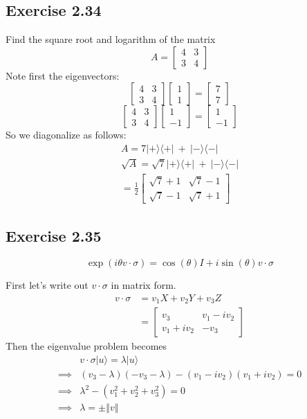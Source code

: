 \documentclass[]{article}
\newcommand{\bra}[1]{\langle #1 |}
\newcommand{\ket}[1]{| #1 \rangle}
\newcommand{\norm}[1]{\left\Vert #1 \right\Vert}
\begin{document}
\subsection{Exercise 2.34}
Find the square root and logarithm of the matrix
\[A=\left[\begin{matrix}
4 & 3\\
3 & 4
\end{matrix}\right]\]
Note first the eigenvectors:
\[
\left[\begin{matrix}
4 & 3\\
3 & 4
\end{matrix}\right]
\left[\begin{matrix}
1\\
1
\end{matrix}\right]
=
\left[\begin{matrix}
7\\
7
\end{matrix}\right]
\]
\[
\left[\begin{matrix}
4 & 3\\
3 & 4
\end{matrix}\right]
\left[\begin{matrix}
1\\
-1
\end{matrix}\right]
=
\left[\begin{matrix}
1\\
-1
\end{matrix}\right]
\]
So we diagonalize as follows:
\begin{align*}
A = 7\ket{+}\bra{+}\ +\ \ket{-}\bra{-}
\\\sqrt{A} = \sqrt{7}\ket{+}\bra{+}\ +\ \ket{-}\bra{-}
\\=
\frac{1}{2}\left[\begin{matrix}
\sqrt{7}+1 & \sqrt{7}-1\\
\sqrt{7}-1 & \sqrt{7}+1
\end{matrix}\right]
\end{align*}

\subsection{Exercise 2.35}
\[\exp(i\theta v\cdot \sigma)=\cos(\theta)I+i\sin(\theta) v\cdot \sigma\]

First let's write out $v \cdot \sigma$ in matrix form.
\begin{align*}
v \cdot \sigma
&= v_1X + v_2Y + v_3Z
\\&=
\left[\begin{matrix}
v_3 & v_1 -iv_2\\
v_1+iv_2 & -v_3
\end{matrix}\right]
\end{align*}
Then the eigenvalue problem becomes
\begin{align*}
&v \cdot \sigma \ket{u} = \lambda \ket{u}
\\\implies& (v_3-\lambda)(-v_3-\lambda) -(v_1-iv_2)(v_1+iv_2) = 0
\\\implies& \lambda^2 - (v_1^2 + v_2^2 + v_3^2) = 0
\\\implies& \lambda = \pm \norm{v}
\end{align*}
\end{document}
